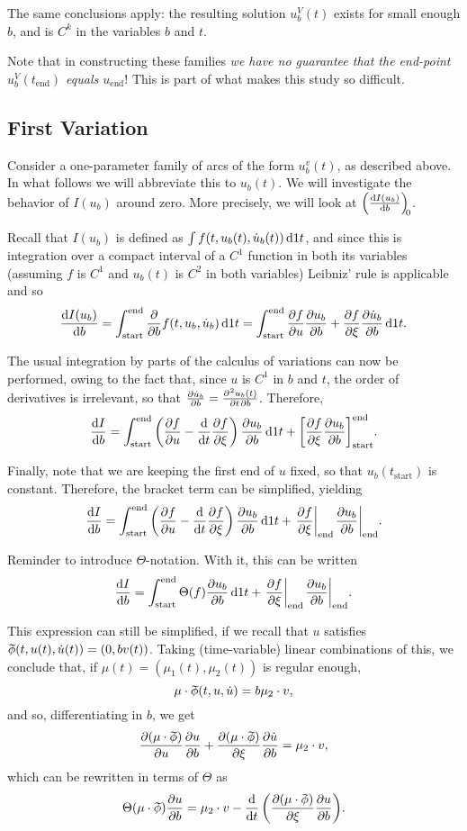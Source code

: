 \documentclass{article}
\theoremstyle{plain}
\theoremstyle{nonumberplain}
\newcommand{\tstart}{\mathrm{start}}
\newcommand{\tend}{\mathrm{end}}
\newcommand{\wtphi}{
  \mspace{2mu}
  \widetilde{\mspace{-2mu}\smash[t]{\phi}}
}
\DeclarePairedDelimiter\eval{.}{\rvert}
\DeclarePairedDelimiter\bracket{[}{]}
\begin{document}
The same conclusions apply: the resulting solution $u^V_b(t)$ exists for small enough $b$, and is $C^k$ in the variables $b$ and $t$.

Note that in constructing these families \emph{we have no guarantee that the end-point $u_b^V(t_\tend)$ equals $u_\tend$}! This is part of what makes this study so difficult.

\subsection{First Variation}

Consider a one-parameter family of arcs of the form $u_b^v(t)$, as described above. In what follows we will abbreviate this to $u_b(t)$. We will investigate the behavior of $I(u_b)$ around zero. More precisely, we will look at $\diff{I(u_b)}b[0]$.

Recall that $I(u_b)$ is defined as $\int f(t, u_b(t), \dot u_b(t)) \dl1 t$, and since this is integration over a compact interval of a $C^1$ function in both its variables (assuming $f$ is $C^1$ and $u_b(t)$ is $C^2$ in both variables) Leibniz' rule is applicable and so
\[\diff{I(u_b)}b = \int_\tstart^\tend \diffp*{f(t, u_b, \dot u_b)}b \dl1 t =\int_\tstart^\tend \diffp f u \diffp{u_b}b + \diffp f \xi \diffp{\dot u_b}b \dl1 t.\]

The usual integration by parts of the calculus of variations can now be performed, owing to the fact that, since $u$ is $C^1$ in $b$ and $t$, the order of derivatives is irrelevant, so that $\diffp{\dot u_b}b = \diffp{u_b(t)}{t,b}$. Therefore,
\[\diff I b = \int_\tstart^\tend \left( \diffp f u - \diff*{\diffp f \xi}t \right) \diffp{u_b}b \dl1 t + \bracket*{ \diffp f \xi \diffp{u_b}b }_\tstart^\tend.\]

Finally, note that we are keeping the first end of $u$ fixed, so that $u_b(t_\tstart)$ is constant. Therefore, the bracket term can be simplified, yielding
\[\diff I b = \int_\tstart^\tend \left( \diffp f u - \diff*{\diffp f \xi}t \right) \diffp{u_b}b \dl1 t + \eval*{\diffp f \xi}_\tend \eval*{\diffp{u_b}b}_\tend.\]

Reminder to introduce $\Theta$-notation. With it, this can be written
\[\diff I b = \int_\tstart^\tend \Theta(f) \diffp{u_b}b \dl1 t + \eval*{\diffp f \xi}_\tend \eval*{\diffp{u_b}b}_\tend.\]

This expression can still be simplified, if we recall that $u$ satisfies $\wtphi(t,u(t), \dot u(t)) = (0, b v(t))$. Taking (time-variable) linear combinations of this, we conclude that, if $\mu(t) = (\mu_1(t), \mu_2(t))$ is regular enough,
\[\mu \cdot \wtphi(t, u, \dot u) = b \mu_2 \cdot v,\]
and so, differentiating in $b$, we get
\[\diffp{(\mu \cdot \wtphi)}u \diffp u b + \diffp{(\mu \cdot \wtphi)}\xi \diffp{\dot u}b = \mu_2 \cdot v,\]
which can be rewritten in terms of $\Theta$ as
\[\Theta(\mu \cdot \wtphi) \diffp u b = \mu_2 \cdot v - \diff*{\left(\diffp{(\mu \cdot \wtphi)}\xi \diffp u b \right)}t.\]
\end{document}
